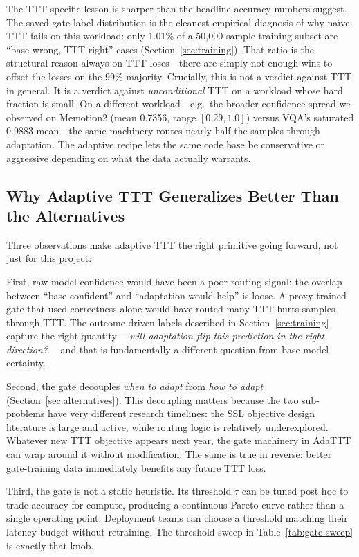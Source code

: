 \documentclass[conference]{IEEEtran}
\begin{document}
The TTT-specific lesson is sharper than the headline accuracy numbers
suggest. The saved gate-label distribution is the cleanest empirical
diagnosis of why naïve TTT fails on this workload: only 1.01\% of a
50{,}000-sample training subset are ``base wrong, TTT right'' cases
(Section~\ref{sec:training}). That ratio is the structural reason
always-on TTT loses---there are simply not enough wins to offset the
losses on the 99\% majority. Crucially, this is not a verdict against
TTT in general. It is a verdict against \emph{unconditional} TTT on a
workload whose hard fraction is small. On a different workload---e.g.\
the broader confidence spread we observed on Memotion2 (mean 0.7356,
range $[0.29, 1.0]$) versus VQA's saturated 0.9883 mean---the same
machinery routes nearly half the samples through adaptation. The
adaptive recipe lets the same code base be conservative or aggressive
depending on what the data actually warrants.

\subsection{Why Adaptive TTT Generalizes Better Than the Alternatives}

Three observations make adaptive TTT the right primitive going forward,
not just for this project:

First, raw model confidence would have been a poor routing signal: the
overlap between ``base confident'' and ``adaptation would help'' is
loose. A proxy-trained gate that used correctness alone would have
routed many TTT-hurts samples through TTT. The outcome-driven labels
described in Section~\ref{sec:training} capture the right quantity---
\emph{will adaptation flip this prediction in the right direction?}---
and that is fundamentally a different question from base-model
certainty.

Second, the gate decouples \emph{when to adapt} from \emph{how to adapt}
(Section~\ref{sec:alternatives}). This decoupling matters because the
two sub-problems have very different research timelines: the SSL
objective design literature is large and active, while routing logic is
relatively underexplored. Whatever new TTT objective appears next year,
the gate machinery in AdaTTT can wrap around it without modification.
The same is true in reverse: better gate-training data immediately
benefits any future TTT loss.

Third, the gate is not a static heuristic. Its threshold $\tau$ can be
tuned post hoc to trade accuracy for compute, producing a continuous
Pareto curve rather than a single operating point. Deployment teams
can choose a threshold matching their latency budget without retraining.
The threshold sweep in Table~\ref{tab:gate-sweep} is exactly that knob.
\end{document}

